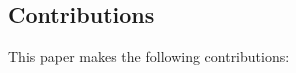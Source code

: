 \documentclass{sig-alternate}
\begin{document}








\subsection{Contributions}

This paper makes the following contributions:
\end{document}
